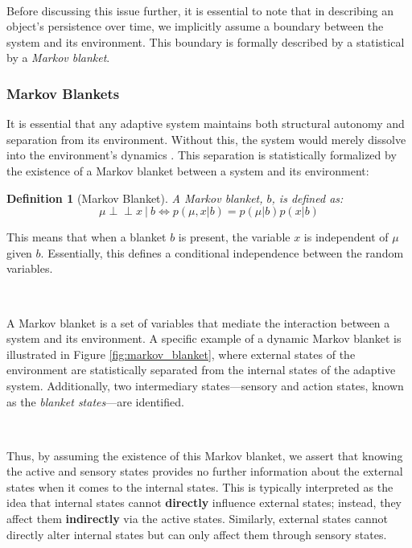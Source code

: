 \documentclass{article}
\newcommand{\indep}{\perp \!\!\! \perp}
\newtheorem{definition}{Definition}
\begin{document}
\

Before discussing this issue further, it is essential to note that in describing an object's persistence over time, we implicitly assume a boundary between the system and its environment. This boundary is formally described by a statistical by a \textit{Markov blanket}.

\subsubsection{Markov Blankets}

It is essential that any adaptive system maintains both structural autonomy and separation from its environment. Without this, the system would merely dissolve into the environment's dynamics \citep{parr2022ActiveInference}. This separation is statistically formalized by the existence of a Markov blanket \citep{pearl1988Probabilistic} between a system and its environment:

\begin{definition}[Markov Blanket]\label{def:markov_blanket}
A Markov blanket, $b$, is defined as:
$$ \mu \indep x \  | \ b \iff p(\mu, x | b) = p(\mu | b) p(x | b) $$
\end{definition}

This means that when a blanket $b$ is present, the variable $x$ is independent of $\mu$ given $b$. Essentially, this defines a conditional independence between the random variables.

\

A Markov blanket is a set of variables that mediate the interaction between a system and its environment. A specific example of a dynamic Markov blanket is illustrated in Figure \ref{fig:markov_blanket}, where external states of the environment are statistically separated from the internal states of the adaptive system. Additionally, two intermediary states—sensory and action states, known as the \textit{blanket states}—are identified. 

\

Thus, by assuming the existence of this Markov blanket, we assert that knowing the active and sensory states provides no further information about the external states when it comes to the internal states. This is typically interpreted as the idea that internal states cannot \textbf{directly} influence external states; instead, they affect them \textbf{indirectly} via the active states. Similarly, external states cannot directly alter internal states but can only affect them through sensory states.
\end{document}
